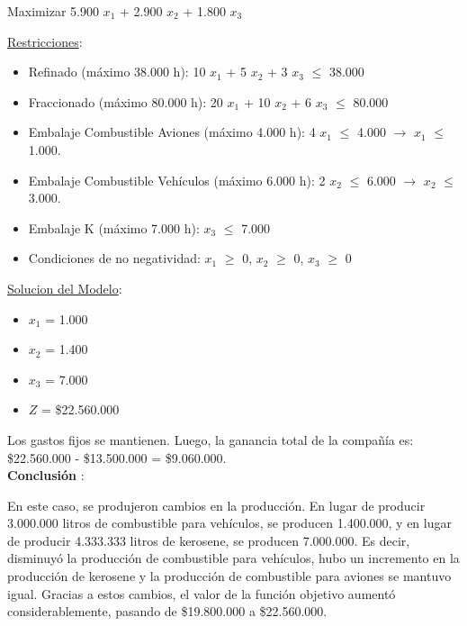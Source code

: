 \documentclass[10pt,a4paper]{article}
\begin{document}
\begin{enumerate}[label=\textbf{\sffamily\large\arabic*.}]
\begin{center}
        Maximizar 5.900 $x_{1}$ + 2.900 $x_{2}$ + 1.800 $x_{3}$

    \end{center}

    \underline{Restricciones}: 

    \begin{itemize}

        \item Refinado (máximo 38.000 h): 10 $x_{1}$ + 5 $x_{2}$ + 3 $x_{3}$ $\leq$ 38.000
        \item Fraccionado (máximo 80.000 h): 20 $x_{1}$ + 10 $x_{2}$ + 6 $x_{3}$ $\leq$ 80.000
        \item Embalaje Combustible Aviones (máximo 4.000 h): 4 $x_{1}$ $\leq$ 4.000 $\rightarrow$ $x_{1}$ $\leq$ 1.000.
        \item Embalaje Combustible Vehículos (máximo 6.000 h): 2 $x_{2}$ $\leq$ 6.000 $\rightarrow$ $x_{2}$ $\leq$ 3.000.
        \item Embalaje K (máximo 7.000 h): $x_{3}$ $\leq$ 7.000
        \item Condiciones de no negatividad: $x_{1}$ $\geq$ 0, $x_{2}$ $\geq$ 0, $x_{3}$ $\geq$ 0\\

    \end{itemize}

    \underline{Solucion del Modelo}: 

    \begin{itemize}

        \item $x_{1}$ = 1.000
        \item $x_{2}$ = 1.400
        \item $x_{3}$ = 7.000
        \item $Z$ = \$22.560.000\\

    \end{itemize}
    

    Los gastos fijos se mantienen. Luego, la ganancia total de la compañía es: \$22.560.000 - \$13.500.000 = \$9.060.000. \\

    \textbf{Conclusión }:
    
    En este caso, se produjeron cambios en la producción. En lugar de producir 3.000.000 litros de combustible para vehículos, se producen 1.400.000, y en lugar de producir 4.333.333 litros de kerosene, se producen 7.000.000. \newline
    Es decir, disminuyó la producción de combustible para vehículos, hubo un incremento en la producción de kerosene y la producción de combustible para aviones se mantuvo igual. Gracias a estos cambios, el valor de la función objetivo aumentó considerablemente, pasando de \$19.800.000 a \$22.560.000. \\


\end{enumerate}
\end{document}
